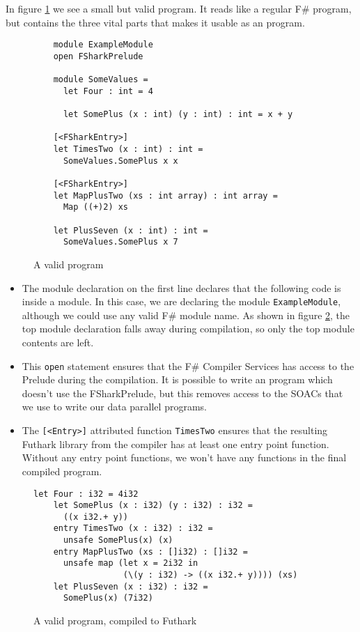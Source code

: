 In figure \ref{fig:validfsharkprogram} we see a small but valid \fshark{} program. It
reads like a regular F\# program, but contains the three vital parts that makes
it usable as an \fshark{} program.

\begin{figure}[h]
  \centering
  \begin{verbatim}
    module ExampleModule
    open FSharkPrelude

    module SomeValues =
      let Four : int = 4

      let SomePlus (x : int) (y : int) : int = x + y

    [<FSharkEntry>]
    let TimesTwo (x : int) : int =
      SomeValues.SomePlus x x
  
    [<FSharkEntry>]
    let MapPlusTwo (xs : int array) : int array =
      Map ((+)2) xs

    let PlusSeven (x : int) : int =
      SomeValues.SomePlus x 7
  \end{verbatim}
  \caption{A valid \fshark{} program}
  \label{fig:validfsharkprogram}
\end{figure}

\begin{itemize}
\item The module declaration on the first line declares that the following code
  is inside a module. In this case, we are declaring the module
  \texttt{ExampleModule}, although we could use any valid F\# module name.
  As shown in figure \ref{fig:validfsharkprogramresult}, the top module
  declaration falls away during compilation, so only the top module contents are
  left.

\item This \texttt{open} statement ensures that the F\# Compiler Services has
  access to the \fshark{}Prelude during the compilation. It is possible to write an
  \fshark{} program which doesn't use the FSharkPrelude, but this removes access to
  the SOACs that we use to write our data parallel programs.

\item The \texttt{[<\fshark{}Entry>]} attributed function \texttt{TimesTwo} ensures
  that the resulting Futhark library from the \fshark{} compiler has at least one
  entry point function.
  Without any entry point functions, we won't have any functions in the final
  compiled \fshark{} program.
\end{itemize}

\begin{figure}
  \centering
\begin{lstlisting}[language=Futhark]
    let Four : i32 = 4i32
    let SomePlus (x : i32) (y : i32) : i32 =
      ((x i32.+ y))
    entry TimesTwo (x : i32) : i32 =
      unsafe SomePlus(x) (x)
    entry MapPlusTwo (xs : []i32) : []i32 =
      unsafe map (let x = 2i32 in
                  (\(y : i32) -> ((x i32.+ y)))) (xs)
    let PlusSeven (x : i32) : i32 =
      SomePlus(x) (7i32)
      \end{lstlisting}
  \caption{A valid \fshark{} program, compiled to Futhark}
  \label{fig:validfsharkprogramresult}
\end{figure}

